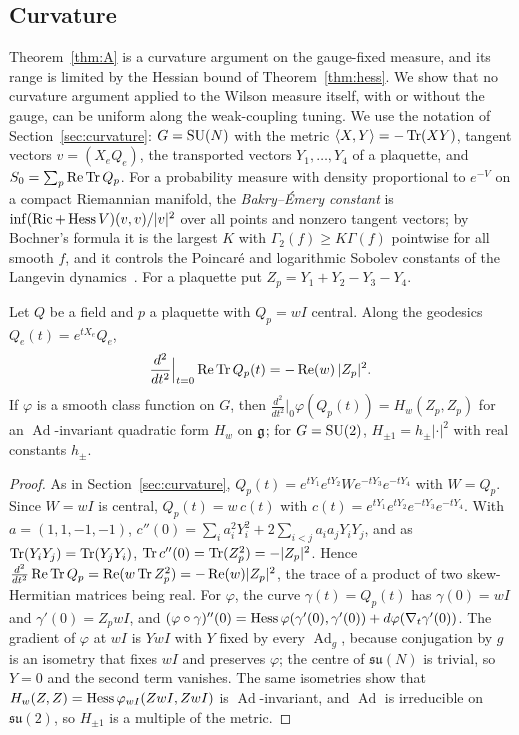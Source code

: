 \subsection{Curvature}\label{ssec:curvlimits}

Theorem~\ref{thm:A} is a curvature argument on the gauge-fixed measure, and its
range is limited by the Hessian bound of Theorem~\ref{thm:hess}. We show that
no curvature argument applied to the Wilson measure itself, with or without the
gauge, can be uniform along the weak-coupling tuning. We use the notation of
Section~\ref{sec:curvature}: $G=\mathrm{SU}(N)$ with the metric $\langle X,Y\rangle=-\operatorname{Tr}(XY)$,
tangent vectors $v=(X_eQ_e)$, the transported vectors $Y_1,\dots,Y_4$ of a
plaquette, and $S_0=\sum_p\operatorname{Re}\operatorname{Tr} Q_p$. For a probability measure with density
proportional to $e^{-V}$ on a compact Riemannian manifold, the
\emph{Bakry--\'Emery constant} is $\inf(\operatorname{Ric}+\operatorname{Hess} V)(v,v)/|v|^2$ over all
points and nonzero tangent vectors; by Bochner's formula it is the largest $K$
with $\Gamma_2(f)\ge K\Gamma(f)$ pointwise for all smooth $f$, and it controls
the Poincar\'e and logarithmic Sobolev constants of the Langevin
dynamics~\cite{BGL14}. For a plaquette put $Z_p=Y_1+Y_2-Y_3-Y_4$.

\begin{lemma}\label{lem:central}
Let $Q$ be a field and $p$ a plaquette with $Q_p=wI$ central. Along the
geodesics $Q_e(t)=e^{tX_e}Q_e$,
\[
\frac{d^2}{dt^2}\Big|_{t=0}\operatorname{Re}\operatorname{Tr} Q_p(t)=-\operatorname{Re}(w)\,|Z_p|^2 .
\]
If $\varphi$ is a smooth class function on $G$, then $\frac{d^2}{dt^2}|_0
\varphi(Q_p(t))=H_w(Z_p,Z_p)$ for an $\operatorname{Ad}$-invariant quadratic
form $H_w$ on $\mathfrak{g}$; for $G=\mathrm{SU}(2)$, $H_{\pm1}=h_\pm|\cdot|^2$ with real constants
$h_\pm$.
\end{lemma}

\begin{proof}
As in Section~\ref{sec:curvature}, $Q_p(t)=e^{tY_1}e^{tY_2}We^{-tY_3}e^{-tY_4}$
with $W=Q_p$. Since $W=wI$ is central, $Q_p(t)=w\,c(t)$ with $c(t)=e^{tY_1}
e^{tY_2}e^{-tY_3}e^{-tY_4}$. With $a=(1,1,-1,-1)$, $c''(0)=\sum_ia_i^2Y_i^2+2
\sum_{i<j}a_ia_jY_iY_j$, and as $\operatorname{Tr}(Y_iY_j)=\operatorname{Tr}(Y_jY_i)$, $\operatorname{Tr} c''(0)=\operatorname{Tr}(Z_p^2)
=-|Z_p|^2$. Hence $\frac{d^2}{dt^2}\operatorname{Re}\operatorname{Tr} Q_p=\operatorname{Re}(w\operatorname{Tr} Z_p^2)=
-\operatorname{Re}(w)|Z_p|^2$, the trace of a product of two skew-Hermitian
matrices being real. For $\varphi$, the curve $\gamma(t)=Q_p(t)$ has
$\gamma(0)=wI$ and $\gamma'(0)=Z_pwI$, and $(\varphi\circ\gamma)''(0)=\operatorname{Hess}
\varphi(\gamma'(0),\gamma'(0))+d\varphi(\nabla_t\gamma'(0))$. The gradient of
$\varphi$ at $wI$ is $YwI$ with $Y$ fixed by every $\operatorname{Ad}_g$, because
conjugation by $g$ is an isometry that fixes $wI$ and preserves $\varphi$; the
centre of $\mathfrak{su}(N)$ is trivial, so $Y=0$ and the second term vanishes.
The same isometries show that $H_w(Z,Z)=\operatorname{Hess}\varphi_{wI}(ZwI,ZwI)$ is
$\operatorname{Ad}$-invariant, and $\operatorname{Ad}$ is irreducible on
$\mathfrak{su}(2)$, so $H_{\pm1}$ is a multiple of the metric.
\end{proof}

